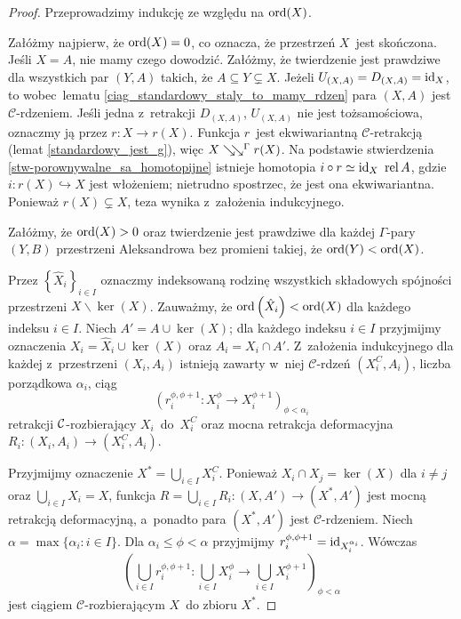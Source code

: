 \begin{proof}
Przeprowadzimy indukcję ze względu na $\operatorname{ord}(X)$. %

Załóżmy najpierw, że $\operatorname{ord}(X)=0$, co oznacza, że przestrzeń $X$~jest skończona. Jeśli $X=A$, nie mamy czego dowodzić. Załóżmy, że twierdzenie jest prawdziwe dla wszystkich par $(Y,A)$ takich, że $A\subseteq Y\subsetneq X$. Jeżeli $U_{(X,A)}=D_{(X,A)}=\operatorname{id}_X$, to wobec~lematu \ref{ciag_standardowy_staly_to_mamy_rdzen} para $(X,A)$ jest $\mathcal{C}$-rdzeniem. Jeśli jedna z~retrakcji $D_{(X,A)}$, $U_{(X,A)}$ nie jest tożsamościowa, oznaczmy ją przez $r\colon X\to r(X)$. Funkcja $r$~jest ekwiwariantną $\mathcal{C}$-retrakcją (lemat \ref{standardowy_jest_g}), więc \mbox{$X\searrow\!\!\searrow^\Gamma r(X)$}. Na podstawie stwierdzenia \ref{stw-porownywalne_sa_homotopijne} istnieje homotopia $i\circ r\simeq \id_X\ \operatorname{rel} A$, gdzie $i\colon r(X)\hookrightarrow X$ jest włożeniem; nietrudno spostrzec, że jest ona ekwiwariantna. Ponieważ $r(X)\subsetneq X$, teza wynika z~założenia indukcyjnego.

Załóżmy, że $\operatorname{ord}(X)>0$ oraz twierdzenie jest prawdziwe dla każdej \mbox{$\Gamma$-pary} $(Y,B)$ przestrzeni Aleksandrowa bez promieni takiej, że $\operatorname{ord}(Y)<\operatorname{ord}(X)$. 

Przez $\left\{\hat{X}_i\right\}_{i\in I}$ oznaczmy indeksowaną rodzinę wszystkich składowych spójności przestrzeni $X\smallsetminus \ker(X)$. Zauważmy, że $\operatorname{ord}\left(\hat{X}_i\right)<\operatorname{ord}(X)$ dla każdego indeksu $i\in I$. Niech $A'=A\cup \ker(X)$; dla każdego indeksu $i\in I$ przyjmijmy oznaczenia $X_i=\hat{X}_i\cup \ker(X)$ oraz $A_i=X_i\cap A'$. Z~założenia indukcyjnego dla każdej z~przestrzeni $(X_i,A_i)$ istnieją zawarty w~niej $\mathcal{C}$-rdzeń $\left(X_i^C,A_i\right)$, liczba porządkowa $\alpha_i$, ciąg \[\left(r_i^{\phi,\phi+1}\colon X_i^{\phi}\to X_i^{\phi+1}\right)_{\phi<\alpha_i}\] retrakcji $\mathcal{C}$-rozbierający $X_i$~do~$X_i^C$ oraz mocna retrakcja deformacyjna $R_i\colon (X_i,A_i)\to \left(X_i^C,A_i\right)$.

Przyjmijmy oznaczenie $X^*=\bigcup_{i\in I}X_i^C$. Ponieważ $X_i\cap X_j=\ker(X)$ dla $i\not= j$ oraz $\bigcup_{i\in I}X_i=X$, funkcja $R=\bigcup_{i\in I} R_i\colon \left(X,A'\right)\to \left(X^*,A'\right)$ jest mocną retrakcją deformacyjną, a~ponadto para $(X^*,A')$ jest $\mathcal{C}$-rdzeniem. Niech \mbox{$\alpha=\max\{\alpha_i:i\in I\}$}. Dla $\alpha_i \leq \phi<\alpha$ przyjmijmy $r_i^{\phi,\phi+1}=\operatorname{id}_{X_i^{\alpha_i}}$. Wówczas \[\left(\bigcup_{i\in I}r_i^{\phi,\phi+1}\colon \bigcup_{i\in I}X_i^{\phi}\to \bigcup_{i\in I}X_i^{\phi+1}\right)_{\phi<\alpha}\] jest ciągiem $\mathcal{C}$-rozbierającym $X$~do zbioru $X^*$.


\end{proof}

